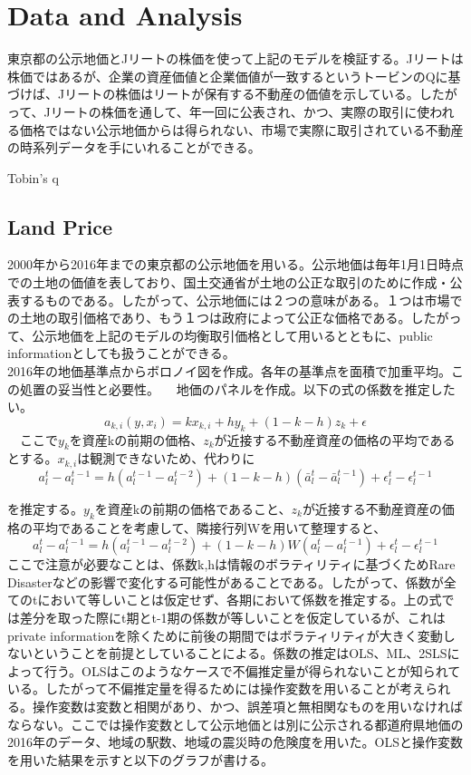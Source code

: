 \documentclass{jsarticle}
\begin{document}
\section{Data and Analysis}
東京都の公示地価とJリートの株価を使って上記のモデルを検証する。Jリートは株価ではあるが、企業の資産価値と企業価値が一致するというトービンのQに基づけば、Jリートの株価はリートが保有する不動産の価値を示している。したがって、Jリートの株価を通して、年一回に公表され、かつ、実際の取引に使われる価格ではない公示地価からは得られない、市場で実際に取引されている不動産の時系列データを手にいれることができる。

\begin{itembox}[l]{Tobin's q}
\end{itembox}
\subsection{Land Price}
2000年から2016年までの東京都の公示地価を用いる。公示地価は毎年1月1日時点での土地の価値を表しており、国土交通省が土地の公正な取引のために作成・公表するものである。したがって、公示地価には２つの意味がある。１つは市場での土地の取引価格であり、もう１つは政府によって公正な価格である。したがって、公示地価を上記のモデルの均衡取引価格として用いるとともに、public informationとしても扱うことができる。\\
2016年の地価基準点からボロノイ図を作成。各年の基準点を面積で加重平均。この処置の妥当性と必要性。
　地価のパネルを作成。以下の式の係数を推定したい。
$$ a_{k, i}(y, x_{i}) = kx_{k, i} + hy_{k} + (1 - k - h)z_{k} + \epsilon $$
　ここで$y_{k}$を資産kの前期の価格、$z_{k}$が近接する不動産資産の価格の平均であるとする。$x_{k, i}$は観測できないため、代わりに
$$ a^{t}_{l} - a^{t-1}_{l} = h(a^{t-1}_{l} - a^{t-2}_{l}) + (1 - k - h)(\bar{a}^{t}_{l} - \bar{a}^{t-1}_{l}) + \epsilon^{t}_{l} - \epsilon^{t-1}_{l} $$

を推定する。$y_{k}$を資産kの前期の価格であること、$z_{k}$が近接する不動産資産の価格の平均であることを考慮して、隣接行列Wを用いて整理すると、
$$ a^{t}_{l} - a^{t-1}_{l} = h(a^{t-1}_{l} - a^{t-2}_{l}) + (1 - k - h)W(a^{t}_{l} - a^{t-1}_{l}) + \epsilon^{t}_{l} - \epsilon^{t-1}_{l} $$
ここで注意が必要なことは、係数k,hは情報のボラティリティに基づくためRare Disasterなどの影響で変化する可能性があることである。したがって、係数が全てのtにおいて等しいことは仮定せず、各期において係数を推定する。上の式では差分を取った際にt期とt-1期の係数が等しいことを仮定しているが、これはprivate informationを除くために前後の期間ではボラティリティが大きく変動しないということを前提としていることによる。係数の推定はOLS、ML、2SLSによって行う。OLSはこのようなケースで不偏推定量が得られないことが知られている。したがって不偏推定量を得るためには操作変数を用いることが考えられる。操作変数は変数と相関があり、かつ、誤差項と無相関なものを用いなければならない。ここでは操作変数として公示地価とは別に公示される都道府県地価の2016年のデータ、地域の駅数、地域の震災時の危険度を用いた。OLSと操作変数を用いた結果を示すと以下のグラフが書ける。
\end{document}
